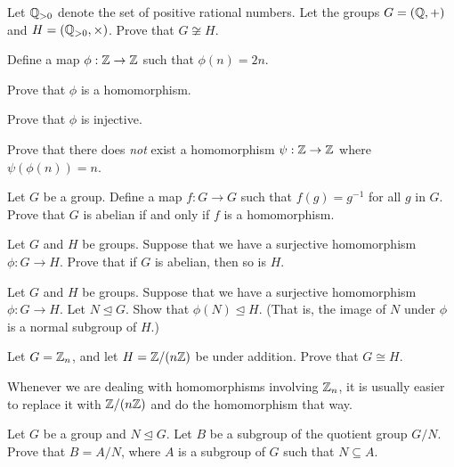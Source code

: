 \begin{problem}
    Let $\mathbb{Q}_{>0}$ denote the set of positive rational numbers. Let the groups $G = (\mathbb{Q}, +)$ and $H = (\mathbb{Q}_{>0}, \times)$. Prove that $G \not\cong H$.
\end{problem}

\begin{problem}
    Define a map $\phi: \mathbb{Z} \to \mathbb{Z}$ such that $\phi(n) = 2n$.
    \begin{partquestions}{\alph*}
        \item Prove that $\phi$ is a homomorphism.
        \item Prove that $\phi$ is injective.
        \item Prove that there does \textit{not} exist a homomorphism $\psi: \mathbb{Z} \to \mathbb{Z}$ where $\psi(\phi(n)) = n$.
    \end{partquestions}
\end{problem}

\begin{problem}
    Let $G$ be a group. Define a map $f: G \to G$ such that $f(g) = g^{-1}$ for all $g$ in $G$. Prove that $G$ is abelian if and only if $f$ is a homomorphism.
\end{problem}

\begin{problem}
    Let $G$ and $H$ be groups. Suppose that we have a surjective homomorphism $\phi: G \to H$. Prove that if $G$ is abelian, then so is $H$.
\end{problem}

\begin{problem}
    Let $G$ and $H$ be groups. Suppose that we have a surjective homomorphism $\phi: G \to H$. Let $N \unlhd G$. Show that $\phi(N) \unlhd H$.\newline
    (That is, the image of $N$ under $\phi$ is a normal subgroup of $H$.)
\end{problem}

\begin{problem}\label{problem-Zn-isomorphic-to-Z-by-nZ}
    Let $G = \mathbb{Z}_n$, and let $H = \mathbb{Z}/(n\mathbb{Z})$ be under addition. Prove that $G \cong H$.
\end{problem}
\begin{remark}
    Whenever we are dealing with homomorphisms involving $\mathbb{Z}_n$, it is usually easier to replace it with $\mathbb{Z}/(n\mathbb{Z})$ and do the homomorphism that way.
\end{remark}

\begin{problem}\label{problem-subgroup-of-quotient-group-is-quotient-group}
    Let $G$ be a group and $N \unlhd G$. Let $B$ be a subgroup of the quotient group $G/N$. Prove that $B = A/N$, where $A$ is a subgroup of $G$ such that $N \subseteq A$.
\end{problem}
